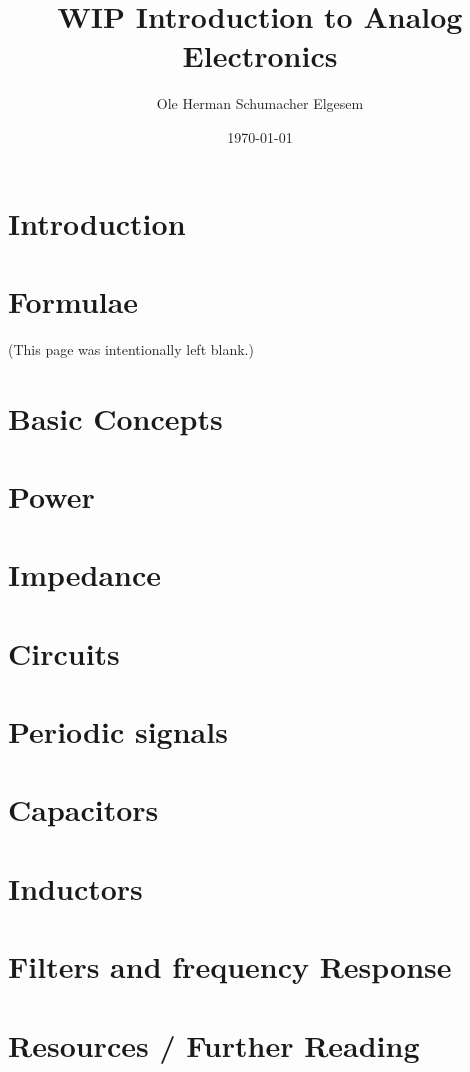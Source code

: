 \documentclass{article}           %
\title{{\color{red} WIP} Introduction to Analog Electronics}
\author{Ole Herman Schumacher Elgesem}
\date{\today}
\numberwithin{equation}{subsection}
\begin{document}
\maketitle
\tableofcontents
\newpage

\section*{Introduction}\label{sec:intro} %

\newpage

\section{Formulae}\label{sec:formula}


\newpage
\begin{centering}
(This page was intentionally left blank.)\\
\end{centering}
\newpage

\section{Basic Concepts}\label{sec:basics}


\section{Power}\label{sec:power}


\section{Impedance}


\section{Circuits}\label{sec:circuits}


\section{Periodic signals}\label{sec:signals}


\section{Capacitors}\label{sec:cap}
\newpage

\section{Inductors}\label{sec:ind}


\section{Filters and frequency Response}\label{sec:frequency}


\section{Resources / Further Reading}\label{sec:resources}


\printbibliography
\end{document}
